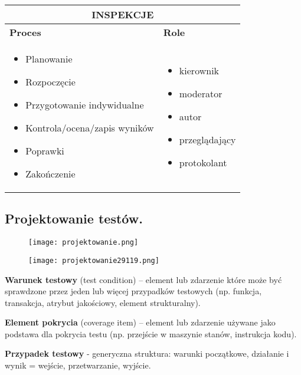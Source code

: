 \documentclass[../main.tex]{subfiles}
\begin{document}
    \begin{table}[H]
        \begin{center}
            \begin{tabular}{| p{8cm}| p{8cm}|}
                \hline
                \multicolumn{2}{|c|}{ \textbf{INSPEKCJE}}\\
                \hline
                \textbf{Proces} & \textbf{Role}\\
                \hline
                \begin{itemize}
                    \item Planowanie
                    \item Rozpoczęcie
                    \item Przygotowanie indywidualne
                    \item Kontrola/ocena/zapis wyników
                    \item Poprawki
                    \item Zakończenie
                \end{itemize}
                &
                \begin{itemize}
                    \item kierownik
                    \item moderator
                    \item autor
                    \item przeglądający
                    \item protokolant
                \end{itemize}\\
                \hline
            \end{tabular}
        \end{center}
    \end{table}


    \subsection{Projektowanie testów.}
    \begin{figure}[H]
        \texttt{[image: projektowanie.png]}
    \end{figure}
    \begin{figure}[H]
        \texttt{[image: projektowanie29119.png]}
    \end{figure}


    \textbf{Warunek testowy} (test condition) – element lub zdarzenie które może być
    sprawdzone przez jeden lub więcej przypadków testowych (np. funkcja,
    transakcja, atrybut jakościowy, element strukturalny).

    \textbf{Element pokrycia} (coverage item) – element lub zdarzenie używane jako
    podstawa dla pokrycia testu (np. przejście w maszynie stanów, instrukcja
    kodu).

    \textbf{Przypadek testowy} - generyczna struktura: warunki początkowe, działanie i wynik = wejście, przetwarzanie, wyjście.
\end{document}
